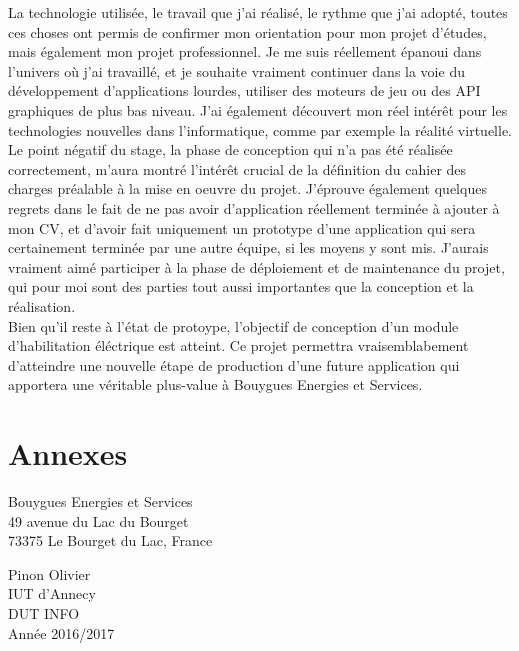 \documentclass[a4paper]{article}
\begin{document}
    La technologie utilisée, le travail que j'ai réalisé, le rythme que j'ai adopté, toutes ces choses ont permis de confirmer mon orientation pour mon projet d'études, mais également mon projet professionnel. Je me suis réellement épanoui dans l'univers où j'ai travaillé, et je souhaite vraiment continuer dans la voie du développement d'applications lourdes, utiliser des moteurs de jeu ou des API graphiques de plus bas niveau. J'ai également découvert mon réel intérêt pour les technologies nouvelles dans l'informatique, comme par exemple la réalité virtuelle. \\

    Le point négatif du stage, la phase de conception qui n'a pas été réalisée correctement, m'aura montré l'intérêt crucial de la définition du cahier des charges préalable à la mise en oeuvre du projet. J'éprouve également quelques regrets dans le fait de ne pas avoir d'application réellement terminée à ajouter à mon CV, et d'avoir fait uniquement un prototype d'une application qui sera certainement terminée par une autre équipe, si les moyens y sont mis. J'aurais vraiment aimé participer à la phase de déploiement et de maintenance du projet, qui pour moi sont des parties tout aussi importantes que la conception et la réalisation. \\

    Bien qu'il reste à l'état de protoype, l'objectif de conception d'un module d'habilitation éléctrique est atteint. Ce projet permettra vraisemblabement d'atteindre une nouvelle étape de production d'une future application qui apportera une véritable plus-value à Bouygues Energies et Services.

    \section{Annexes}
    
    \newpage 
    \normalsize
    \thispagestyle{empty}
    \noindent
    \begin{minipage}{.5\textwidth}
        Bouygues Energies et Services \\
        49 avenue du Lac du Bourget \\
        73375 Le Bourget du Lac, France
    \end{minipage}
    \begin{minipage}{.5\textwidth}
    \begin{flushright}
        Pinon Olivier \\
        IUT d'Annecy \\
        DUT INFO \\
        Année 2016/2017 \\
    \end{flushright}
    \end{minipage}
\end{document}
